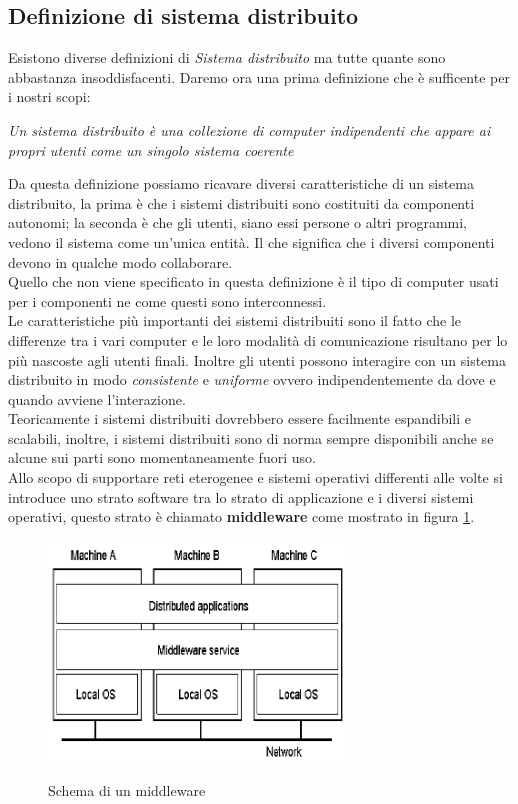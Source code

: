 \subsection{Definizione di sistema distribuito}
Esistono diverse definizioni di \emph{Sistema distribuito} ma tutte quante sono abbastanza insoddisfacenti. Daremo ora una prima definizione che è sufficente per i nostri scopi:
\begin{center}
\emph{Un sistema distribuito è una collezione di computer indipendenti che appare ai propri utenti come un singolo sistema coerente}
\end{center}
Da questa definizione possiamo ricavare diversi caratteristiche di un sistema distribuito, la prima è che i sistemi distribuiti sono costituiti da componenti autonomi; la seconda è che gli utenti, siano essi persone o altri programmi, vedono il sistema come un'unica entità. Il che significa che i diversi componenti devono in qualche modo collaborare.\\
Quello che non viene specificato in questa definizione è il tipo di computer usati per i componenti ne come questi sono interconnessi.\\
Le caratteristiche più importanti dei sistemi distribuiti sono il fatto che le differenze tra i vari computer e le loro modalità di comunicazione risultano per lo più nascoste agli utenti finali. Inoltre gli utenti possono interagire con un sistema distribuito in modo \emph{consistente} e \emph{uniforme} ovvero indipendentemente da dove e quando avviene l'interazione.\\
Teoricamente i sistemi distribuiti dovrebbero essere facilmente espandibili e scalabili, inoltre, i sistemi distribuiti sono di norma sempre disponibili anche se alcune sui parti sono momentaneamente fuori uso.\\
Allo scopo di supportare reti eterogenee e sistemi operativi differenti alle volte si introduce uno strato software tra lo strato di applicazione e i diversi sistemi operativi, questo strato è chiamato \textbf{middleware} come mostrato in figura \ref{fig:midd}.
\begin{figure}[htb]
\centering
\includegraphics[width=8cm]{img/schemamidd.png}\\
\label{fig:midd}
\caption{Schema di un middleware}
\end{figure}

